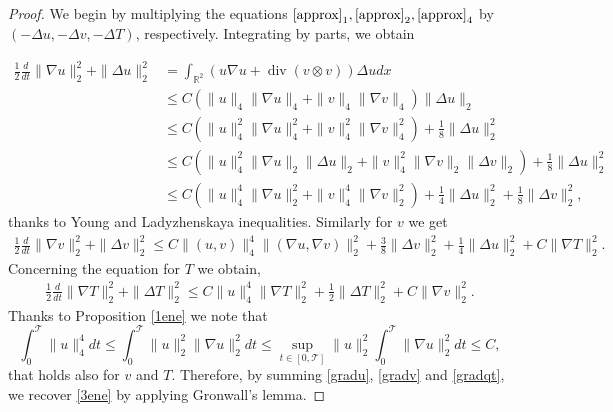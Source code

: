 \documentclass[11pt, a4paper, article,reqno,]{amsart}
\theoremstyle{remark}
\DeclareMathOperator{\dive}{div}
\numberwithin{equation}{section}
\begin{document}
\begin{proof}
We begin by multiplying the equations 
$\eqref{approx}_1,\eqref{approx}_2, \eqref{approx}_4$ 
by $(-\Delta u, -\Delta v, -\Delta T)$, respectively.
Integrating by parts, we obtain

    \begin{equation}\label{gradu}
    \begin{aligned}
        \frac{1}{2}\frac{d}{dt}\|\nabla u\|_2^2 + \|\Delta u\|_2^2 & = \int_{\mathbb{R}^2}(u\nabla u + \dive(v \otimes v))\Delta u dx \\
        & \leq C(\|u\|_4\|\nabla u\|_4 + \|v\|_4\|\nabla v\|_4)\|\Delta u\|_2 \\
        & \leq C(\|u\|_4^2\|\nabla u\|_4^2 + \|v\|_4^2 \|\nabla v\|_4^2)+ \frac{1}{8}\|\Delta u\|_2^2 \\
        & \leq C( \|u\|_4^2\|\nabla u\|_2\|\Delta u\|_2 + \|v\|_4^2\|\nabla v\|_2\|\Delta v\|_2) + \frac{1}{8}\|\Delta u\|_2^2 \\
        &\leq C(\|u\|_4^4\|\nabla u\|_2^2 + \|v\|_4^4 \|\nabla v\|_2^2) + \frac{1}{4}\|\Delta u\|_2^2 + \frac{1}{8}\|\Delta v\|_2^2,
    \end{aligned}
\end{equation}
    thanks to Young and Ladyzhenskaya inequalities. Similarly for $v$ we get
     \begin{equation}\label{gradv}
    \begin{aligned}
        \frac{1}{2}\frac{d}{dt}\|\nabla v\|_2^2 + \|\Delta v\|_2^2 \leq C\|(u,v)\|_4^4 \|(\nabla u,\nabla v)\|_2^2 + \frac{3}{8}\|\Delta v\|_2^2 + \frac{1}{4}\|\Delta u\|_2^2 + C \|\nabla T\|_2^2.
    \end{aligned}
\end{equation}
Concerning the equation for $T$ we obtain,
\begin{equation}\label{gradqt}
    \begin{aligned}
        \frac{1}{2}\frac{d}{dt}\|\nabla T\|_2^2 + \|\Delta T\|_2^2 \leq C\|u\|_4^4 \|\nabla T\|_2^2 + \frac{1}{2}\|\Delta T\|_2^2 + C\|\nabla v\|_2^2.
    \end{aligned}
\end{equation}
Thanks to Proposition \ref{1ene} we note that
\begin{equation*}
    \int_0^\mathcal{T} \|u\|_4^4 dt \leq \int_0^\mathcal{T} \|u\|_2^2 \|\nabla u\|_2^2 dt \leq \sup_{ t \in [0,\mathcal{T}]} \|u\|_2^2 \int_0^\mathcal{T} \|\nabla u\|_2^2 dt \leq  C,
\end{equation*}
that holds also for $v$ and $T$. Therefore, by summing \eqref{gradu}, \eqref{gradv} and \eqref{gradqt}, we recover \eqref{3ene} by applying Gronwall's lemma.

\end{proof}
\end{document}
